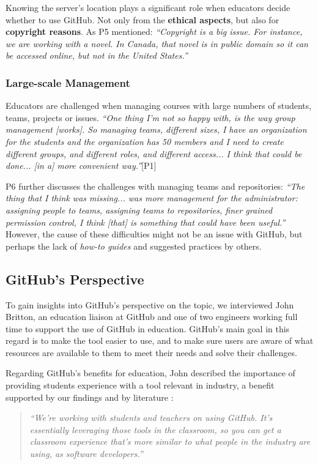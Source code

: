 Knowing the server's location plays a significant role when educators decide whether to use GitHub. Not only from the \textbf{ethical aspects}, but also for \textbf{copyright reasons}. As P5 mentioned: \textit{``Copyright is a big issue. For instance, we are working with a novel. In Canada, that novel is in public domain so it can be accessed online, but not in the United States.''}

\subsubsection{Large-scale Management}
Educators are challenged when managing courses with large numbers of students, teams, projects or issues. \textit{``One thing I'm not so happy with, is the way group management [works]. So managing teams, different sizes, I have an organization for the students and the organization has 50 members and I need to create different groups, and different roles, and different access... I think that could be done... [in a] more convenient way.''}[P1]

P6 further discusses the challenges with managing teams and repositories: \textit{``The thing that I think was missing... was more management for the administrator: assigning people to teams, assigning teams to repositories, finer grained permission control, I think [that] is something that could have been useful.''} However, the cause of these difficulties might not be an issue with GitHub, but perhaps the lack of \textit{how-to guides} and suggested practices by others.

\subsection{GitHub's Perspective}
To gain insights into GitHub's perspective on the topic, we interviewed John Britton, an education liaison at GitHub and one of two engineers working full time to support the use of GitHub in education. GitHub's main goal in this regard is to make the tool easier to use, and to make sure users are aware of what resources are available to them to meet their needs and solve their challenges.

Regarding GitHub's benefits for education, John described the importance of providing students experience with a tool relevant in industry, a benefit supported by our findings and by literature \cite{haaranen2015teaching}:
\begin{quote}\textit{``We're working with students and teachers on using GitHub. It's essentially leveraging those tools in the classroom, so you can get a classroom experience that's more similar to what people in the industry are using, as software developers.''}\end{quote}

